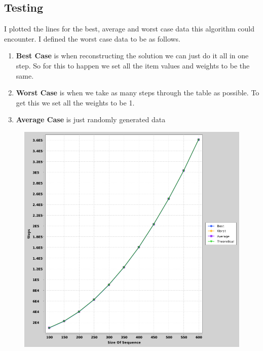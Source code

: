 \documentclass{article}
\begin{document}
		\subsection{Testing}
			I plotted the lines for the best, average and worst case data this algorithm could encounter. I defined the worst case data to be as follows.
			
			\begin{enumerate}
				\item \textbf{Best Case} is when reconstructing the solution we can just do it all in one step. So for this to happen we set all the item values and weights to be the same.
				
				\item \textbf{Worst Case} is when we take as many steps through the table as possible. To get this we set all the weights to be 1.
				
				\item \textbf{Average Case} is just randomly generated data
			\end{enumerate}
			
			\begin{figure}[h]
				\vspace{3mm}
				\begin{center}
					\includegraphics[scale=0.4]{Dynamic.png}
				\end{center}
			\end{figure}
			
\end{document}
